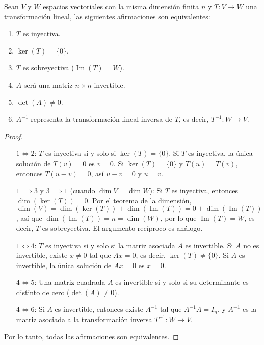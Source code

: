 \begin{theorem}
Sean $V$ y $W$ espacios vectoriales con la misma dimensión finita $n$ y $T: V \to W$ una transformación lineal, las siguientes afirmaciones son equivalentes:
\begin{enumerate}[1.]
    \item $T$ es inyectiva.
    \item $\ker(T) = \{0\}$.
    \item $T$ es sobreyectiva ($\operatorname{Im}(T) = W$).
    \item $A$ será una matriz $n \times n$ invertible.
    \item $\det(A) \neq 0$.
    \item $A^{-1}$ representa la transformación lineal inversa de $T$, es decir, $T^{-1}: W \to V$.
\end{enumerate}
\begin{proof}
\begin{itemize}
    \item[$1 \iff 2$:] $T$ es inyectiva si y solo si $\ker(T) = \{0\}$. Si $T$ es inyectiva, la única solución de $T(v) = 0$ es $v=0$. Si $\ker(T) = \{0\}$ y $T(u) = T(v)$, entonces $T(u-v) = 0$, así $u-v = 0$ y $u = v$.

    \item[$1 \implies 3$ y $3 \implies 1$ (cuando $\dim V = \dim W$):] Si $T$ es inyectiva, entonces $\dim(\ker(T)) = 0$. Por el teorema de la dimensión, $\dim(V) = \dim(\ker(T)) + \dim(\operatorname{Im}(T)) = 0 + \dim(\operatorname{Im}(T))$, así que $\dim(\operatorname{Im}(T)) = n = \dim(W)$, por lo que $\operatorname{Im}(T) = W$, es decir, $T$ es sobreyectiva. El argumento recíproco es análogo.

    \item[$1 \iff 4$:] $T$ es inyectiva si y solo si la matriz asociada $A$ es invertible. Si $A$ no es invertible, existe $x \neq 0$ tal que $Ax = 0$, es decir, $\ker(T) \neq \{0\}$. Si $A$ es invertible, la única solución de $Ax = 0$ es $x = 0$.

    \item[$4 \iff 5$:] Una matriz cuadrada $A$ es invertible si y solo si su determinante es distinto de cero ($\det(A) \neq 0$).

    \item[$4 \iff 6$:] Si $A$ es invertible, entonces existe $A^{-1}$ tal que $A^{-1}A = I_n$, y $A^{-1}$ es la matriz asociada a la transformación inversa $T^{-1}: W \to V$.
\end{itemize}
Por lo tanto, todas las afirmaciones son equivalentes.
\end{proof}
\end{theorem}

